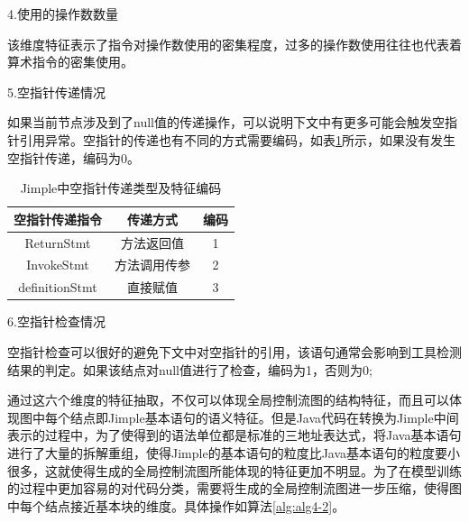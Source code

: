 4.使用的操作数数量

该维度特征表示了指令对操作数使用的密集程度，过多的操作数使用往往也代表着算术指令的密集使用。

5.空指针传递情况

如果当前节点涉及到了null值的传递操作，可以说明下文中有更多可能会触发空指针引用异常。空指针的传递也有不同的方式需要编码，如表\ref{tab:table4-5}所示，如果没有发生空指针传递，编码为0。

\begin{table}[ht]
	\centering
	\caption{Jimple中空指针传递类型及特征编码} \label{tab:table4-5}
	\begin{tabular*}{0.9\textwidth}{@{\extracolsep{\fill}}ccc}
		\toprule
		空指针传递指令	&传递方式	&编码	 \\
		\midrule
		ReturnStmt & 方法返回值	& 1	\\
		InvokeStmt & 方法调用传参	& 2 \\
		definitionStmt & 直接赋值	&3 \\
		\bottomrule
	\end{tabular*}
\end{table}

6.空指针检查情况

空指针检查可以很好的避免下文中对空指针的引用，该语句通常会影响到工具检测结果的判定。如果该结点对null值进行了检查，编码为1，否则为0;

通过这六个维度的特征抽取，不仅可以体现全局控制流图的结构特征，而且可以体现图中每个结点即Jimple基本语句的语义特征。但是Java代码在转换为Jimple中间表示的过程中，为了使得到的语法单位都是标准的三地址表达式，将Java基本语句进行了大量的拆解重组，使得Jimple的基本语句的粒度比Java基本语句的粒度要小很多，这就使得生成的全局控制流图所能体现的特征更加不明显。为了在模型训练的过程中更加容易的对代码分类，需要将生成的全局控制流图进一步压缩，使得图中每个结点接近基本块的维度。具体操作如算法\ref{alg:alg4-2}。

